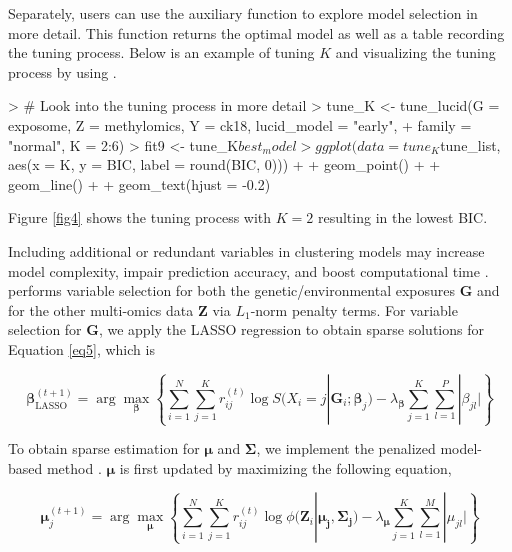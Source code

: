 
Separately, users can use the auxiliary function  to explore model selection in more detail. This function returns the optimal model as well as a table recording the tuning process. Below is an example of tuning $K$ and visualizing the tuning process by using .

\begin{example}
> # Look into the tuning process in more detail
> tune_K <- tune_lucid(G = exposome, Z = methylomics, Y = ck18, lucid_model = "early",
+                      family = "normal", K = 2:6)
> fit9 <- tune_K$best_model
> ggplot(data = tune_K$tune_list, aes(x = K, y = BIC, label = round(BIC, 0))) +
+   geom_point() +
+   geom_line() +
+   geom_text(hjust = -0.2)
\end{example}

Figure \ref{fig4} shows the tuning process with $K = 2$ resulting in the lowest BIC.

Including additional or redundant variables in clustering models may increase model complexity, impair prediction accuracy, and boost computational time \citep{fop2018variable}.  performs variable selection for both the genetic/environmental exposures $\bm G$ and for the other multi-omics data $\bm Z$ via $L_1$-norm penalty terms. For variable selection for $\bm G$, we apply the LASSO regression to obtain sparse solutions for Equation \ref{eq5}, which is

\begin{equation}
     \bm{\beta}_{\text{LASSO}}^{(t+1)} = \arg \max_{\bm{\beta}} \left\{ \sum_{i = 1}^N \sum_{j = 1}^K r_{ij}^{(t)}\log S(X_i = j | \bm{G}_i; \bm{\beta}_j) - \lambda_{\bm{\beta}}\sum_{j = 1}^K\sum_{l = 1}^P |\beta_{jl}| \right\}
     \label{eq14}
\end{equation}

To obtain sparse estimation for $\bm \mu$ and $\bm \Sigma$, we implement the penalized model-based method \citep{zhou2009penalized}. $\bm \mu$ is first updated by maximizing the following equation,

\begin{equation}
    \bm{\mu}_j^{(t+1)} = \arg \max_{\bm \mu} \left \{ \sum_{i = 1}^N \sum_{j = 1}^K r_{ij}^{(t)}\log \phi(\bm{Z}_i| \bm{\mu_j}, \bm{\Sigma_j}) - \lambda_{\bm{\mu}}\sum_{j = 1}^K\sum_{l = 1}^M |\mu_{jl}| \right \}
    \label{eq15}
\end{equation}

